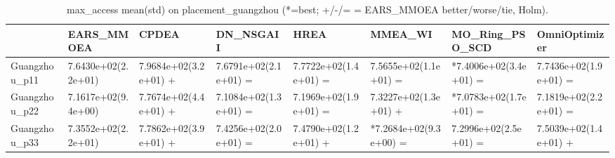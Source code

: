 \begin{table}[t]
\centering
\caption{max_access mean(std) on placement_guangzhou (*=best; +/-/= = EARS_MMOEA better/worse/tie, Holm).}
\label{tab:placement_guangzhou_max_access}
\begin{tabular}{llllllll}
\toprule
 & EARS\_MMOEA & CPDEA & DN\_NSGAII & HREA & MMEA\_WI & MO\_Ring\_PSO\_SCD & OmniOptimizer \\
\midrule
Guangzhou\_p11 & 7.6430e+02(2.2e+01) & 7.9684e+02(3.2e+01) + & 7.6791e+02(2.1e+01) = & 7.7722e+02(1.4e+01) = & 7.5655e+02(1.1e+01) = & *7.4006e+02(3.4e+01) = & 7.7436e+02(1.9e+01) = \\
Guangzhou\_p22 & 7.1617e+02(9.4e+00) & 7.7674e+02(4.4e+01) + & 7.1084e+02(1.3e+01) = & 7.1969e+02(1.9e+01) = & 7.3227e+02(1.3e+01) + & *7.0783e+02(1.7e+01) = & 7.1819e+02(2.2e+01) = \\
Guangzhou\_p33 & 7.3552e+02(2.2e+01) & 7.7862e+02(3.9e+01) + & 7.4256e+02(2.0e+01) = & 7.4790e+02(1.2e+01) + & *7.2684e+02(9.3e+00) = & 7.2996e+02(2.5e+01) = & 7.5039e+02(1.4e+01) + \\
\bottomrule
\end{tabular}
\end{table}
